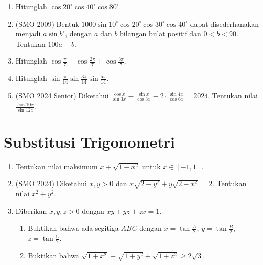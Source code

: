 \documentclass[12pt]{scrartcl}
\begin{document}
\begin{enumerate}

	\item
	Hitunglah $\cos 20^{\circ}\cos 40^{\circ}\cos 80^{\circ}$.

	\item (SMO 2009)
	Bentuk $1000\sin 10^{\circ}\cos 20^{\circ}\cos 30^{\circ}\cos 40^{\circ}$
	dapat disederhanakan menjadi $a\sin b^{\circ}$, dengan $a$ dan $b$ bilangan
	bulat positif dan $0 < b < 90$. Tentukan $100a+b$.

	\item
	Hitunglah $\cos\frac{\pi}{7} - \cos\frac{2\pi}{7} + \cos\frac{3\pi}{7}$.

	\item
	Hitunglah $\sin\frac{\pi}{14}\sin\frac{3\pi}{14}\sin\frac{5\pi}{14}$.

	\item (SMO 2024 Senior)
	Diketahui $\frac{\cos x}{\sin 3x} - \frac{\sin x}{\cos 3x}
	- 2\cdot\frac{\sin 4x}{\cos 6x} = 2024$.
	Tentukan nilai $\frac{\cos 10x}{\sin 12x}$.

\end{enumerate}

\section{Substitusi Trigonometri}

\begin{enumerate}

	\item
	Tentukan nilai maksimum $x + \sqrt{1-x^2}$ untuk $x \in [-1, 1]$.

	\item (SMO 2024)
	Diketahui $x, y > 0$ dan $x\sqrt{2-y^2} + y\sqrt{2-x^2} = 2$.
	Tentukan nilai $x^2+y^2$.

	\item
	Diberikan $x, y, z > 0$ dengan $xy+yz+zx = 1$.
	\begin{enumerate}
		\item Buktikan bahwa ada segitiga $ABC$ dengan $x = \tan\frac{A}{2}$,
		$y = \tan\frac{B}{2}$, $z = \tan\frac{C}{2}$.
		\item Buktikan bahwa $\sqrt{1+x^2} + \sqrt{1+y^2} + \sqrt{1+z^2} \ge 2\sqrt{3}$.
	\end{enumerate}

\end{enumerate}
\end{document}
